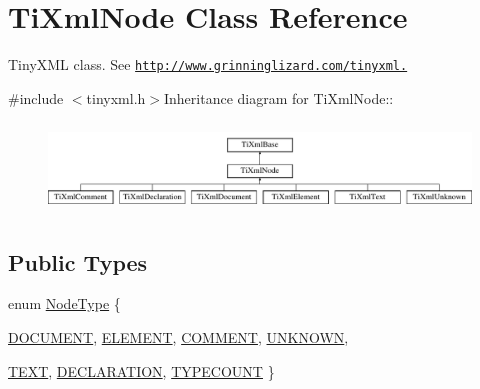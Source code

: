 \hypertarget{class_ti_xml_node}{
\section{TiXmlNode Class Reference}
\label{class_ti_xml_node}
}


TinyXML class. See \href{http://www.grinninglizard.com/tinyxml.}{\tt http://www.grinninglizard.com/tinyxml.}  


{\ttfamily \#include $<$tinyxml.h$>$}Inheritance diagram for TiXmlNode::\begin{figure}[H]
\begin{center}
\leavevmode
\includegraphics[height=2.41379cm]{class_ti_xml_node}
\end{center}
\end{figure}
\subsection*{Public Types}
\begin{DoxyCompactItemize}
\item 
enum \hyperlink{class_ti_xml_node_a836eded4920ab9e9ef28496f48cd95a2}{NodeType} \{ \par
\hyperlink{class_ti_xml_node_a836eded4920ab9e9ef28496f48cd95a2a31b8d14e0558445bb40e36a532b24127}{DOCUMENT}, 
\hyperlink{class_ti_xml_node_a836eded4920ab9e9ef28496f48cd95a2aaf2344bcea122ef52d47c4dcc357f070}{ELEMENT}, 
\hyperlink{class_ti_xml_node_a836eded4920ab9e9ef28496f48cd95a2a7737f35757c7152ca4f612d449ea0e4b}{COMMENT}, 
\hyperlink{class_ti_xml_node_a836eded4920ab9e9ef28496f48cd95a2af521ee2fb1e05705776b28fc55a70037}{UNKNOWN}, 
\par
\hyperlink{class_ti_xml_node_a836eded4920ab9e9ef28496f48cd95a2a672617f36c5606a966ac378e6ddc0fd8}{TEXT}, 
\hyperlink{class_ti_xml_node_a836eded4920ab9e9ef28496f48cd95a2ac02445686c2b72d11385002b3466c28b}{DECLARATION}, 
\hyperlink{class_ti_xml_node_a836eded4920ab9e9ef28496f48cd95a2a8334037fb3fe05c67d6110975b38a8bf}{TYPECOUNT}
 \}
\end{DoxyCompactItemize}
